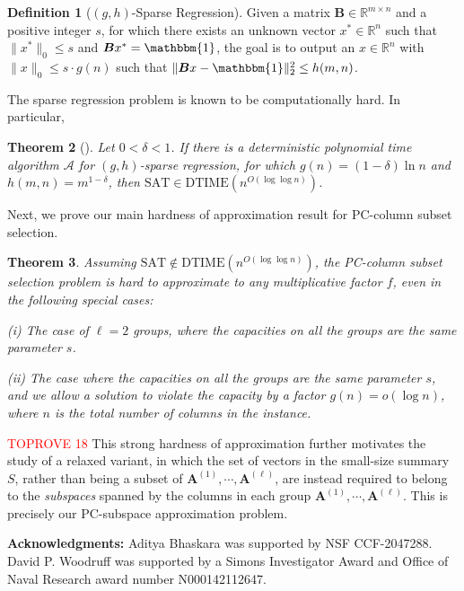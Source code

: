 \documentclass[11pt]{article}
\makeatletter
\theoremstyle{plain}
\newtheorem{theorem}{Theorem}[section]
\theoremstyle{plain}
\theoremstyle{definition}
\newtheorem{defn}[theorem]{Definition}
\theoremstyle{plain}
\theoremstyle{remark}
\newenvironment{proof}[1][\protect\proofname]{\par
	\normalfont\topsep6\p@\@plus6\p@\relax
	\trivlist
	\itemindent\parindent
	\item[\hskip\labelsep\scshape #1]\ignorespaces
}{\endtrivlist\@endpefalse
}
\providecommand{\proofname}{Proof}
\newcommand{\cA}{\mathcal{A}}
\DeclareRobustCommand{\fairCSSx}{PC-column subset selection}
\DeclareRobustCommand{\fairSA}{PC-subspace approximation }
\makeatother
\begin{document}
\begin{defn}[$(g,h)$-Sparse Regression]
Given a matrix $\bm{B} \in \mathbb{R}^{m\times n}$ and a positive integer $s$, for which there exists an unknown vector $x^* \in \mathbb{R}^n$ such that $\|x^*\|_0\leq s$ and $\bm{B}x^*= \mathbbm{1}$, the goal is to output an $x \in \mathbb{R}^n$ with $\|x\|_0 \leq s\cdot g(n)$ such that $\|\bm{B}x-\mathbbm{1}\|_2^2\leq h(m,n)$. \end{defn}



The sparse regression problem is known to be computationally hard. In particular, 
\begin{theorem}[\cite{FKT15}]
    Let $0<\delta <1$. If there is a deterministic polynomial time algorithm $\cA$ for $(g,h)$-sparse regression, for which $g(n)=(1-\delta)\ln n$ and $h(m,n)=m^{1-\delta}$, then $\mathrm{SAT} \in \mathrm{DTIME}(n^{O(\log \log n)})$.   
\end{theorem}



Next, we prove our main hardness of approximation result for \fairCSSx{}.

\begin{theorem}\label{thm:hard-CSS}
Assuming $\mathrm{SAT} \notin \mathrm{DTIME}(n^{O(\log \log n)})$, the \fairCSSx{} problem is hard to approximate to any multiplicative factor $f$, even in the following special cases:

(i) The case of $\ell=2$ groups, where the capacities on all the groups are the same parameter $s$.

(ii) The case where the capacities on all the groups are the same parameter $s$, and we allow a solution to violate the capacity by a factor $g(n) = o(\log n)$, where $n$ is the total number of columns in the instance.
\end{theorem}
\begin{proof}\textcolor{red}{TOPROVE 18}\end{proof}
This strong hardness of approximation further motivates the study of a relaxed variant, in which the set of vectors in the small-size summary $S$, rather than being a subset of $\bm{A}^{(1)}, \cdots, \bm{A}^{(\ell)}$, are instead required to belong to the {\em subspaces} spanned by the columns in each group $\bm{A}^{(1)}, \cdots, \bm{A}^{(\ell)}$. This is precisely our \fairSA{}problem.

{\bf Acknowledgments:} Aditya Bhaskara was supported by NSF CCF-2047288. David P. Woodruff was supported by a Simons Investigator Award and Office of Naval Research award number N000142112647.



\end{document}

